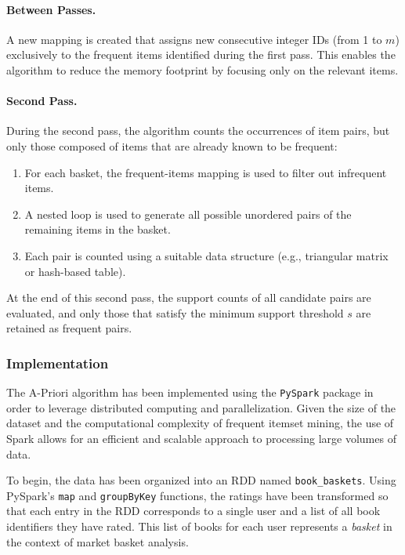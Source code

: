 \documentclass[a4paper,12pt]{article}
\begin{document}
\paragraph{Between Passes.}  
A new mapping is created that assigns new consecutive integer IDs (from 1 to $m$) exclusively to the frequent items identified during the first pass. This enables the algorithm to reduce the memory footprint by focusing only on the relevant items.

\paragraph{Second Pass.}  
During the second pass, the algorithm counts the occurrences of item pairs, but only those composed of items that are already known to be frequent:
\begin{enumerate}
    \item For each basket, the frequent-items mapping is used to filter out infrequent items.
    \item A nested loop is used to generate all possible unordered pairs of the remaining items in the basket.
    \item Each pair is counted using a suitable data structure (e.g., triangular matrix or hash-based table).
\end{enumerate}
At the end of this second pass, the support counts of all candidate pairs are evaluated, and only those that satisfy the minimum support threshold $s$ are retained as frequent pairs.

\subsubsection{Implementation}

The A-Priori algorithm has been implemented using the \texttt{PySpark} package in order to leverage distributed computing and parallelization. Given the size of the dataset and the computational complexity of frequent itemset mining, the use of Spark allows for an efficient and scalable approach to processing large volumes of data.

To begin, the data has been organized into an RDD named \texttt{book\_baskets}. Using PySpark’s \texttt{map} and \texttt{groupByKey} functions, the ratings have been transformed so that each entry in the RDD corresponds to a single user and a list of all book identifiers they have rated. This list of books for each user represents a \textit{basket} in the context of market basket analysis.
\end{document}
